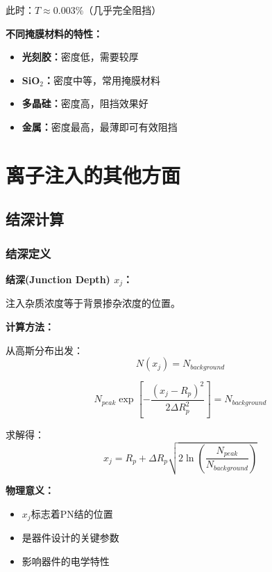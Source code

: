 \documentclass[UTF8,12pt,a4paper]{ctexart}
\begin{document}
此时：$T \approx 0.003\%$（几乎完全阻挡）

\textbf{不同掩膜材料的特性：}
\begin{itemize}
    \item \textbf{光刻胶：}密度低，需要较厚
    \item \textbf{SiO$_2$：}密度中等，常用掩膜材料
    \item \textbf{多晶硅：}密度高，阻挡效果好
    \item \textbf{金属：}密度最高，最薄即可有效阻挡
\end{itemize}

\newpage

\section{离子注入的其他方面}

\subsection{结深计算}

\subsubsection{结深定义}

\textbf{结深(Junction Depth) $x_j$：}

注入杂质浓度等于背景掺杂浓度的位置。

\textbf{计算方法：}

从高斯分布出发：
\begin{equation}
N(x_j) = N_{background}
\end{equation}

\begin{equation}
N_{peak} \exp\left[-\frac{(x_j-R_p)^2}{2\Delta R_p^2}\right] = N_{background}
\end{equation}

求解得：
\begin{equation}
x_j = R_p + \Delta R_p \sqrt{2\ln\left(\frac{N_{peak}}{N_{background}}\right)}
\end{equation}

\textbf{物理意义：}
\begin{itemize}
    \item $x_j$标志着PN结的位置
    \item 是器件设计的关键参数
    \item 影响器件的电学特性
\end{itemize}
\end{document}
